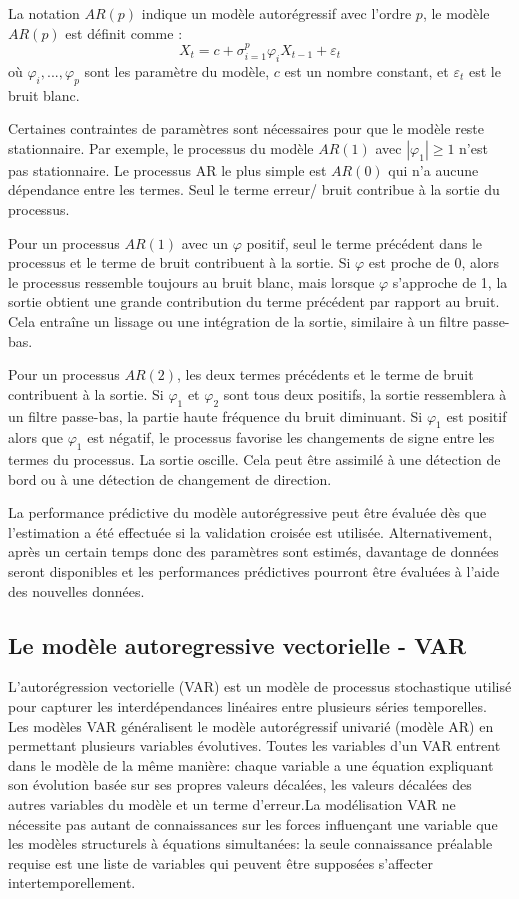 La notation $AR(p)$ indique un modèle autorégressif avec l'ordre $p$, le modèle $AR(p)$ est définit comme : 
$$X_t = c + \sigma_{i = 1}^{p} \varphi_i  X_{t-1} + \varepsilon_t    $$
 où $\varphi_i, ..., \varphi_p$ sont les paramètre du  modèle, $c$ est un nombre constant, et $\varepsilon_t$ est le bruit blanc.
 
 Certaines contraintes de paramètres sont nécessaires pour que le modèle reste stationnaire. Par exemple, le processus du modèle $AR(1)$ avec $ | \varphi_1 | \geq 1 $ n'est pas stationnaire. Le processus AR le plus simple est $AR(0)$ qui n'a aucune dépendance entre les termes. Seul le terme erreur/ bruit contribue à la sortie du processus. 
 
 Pour un processus $AR(1)$ avec un $\varphi$ positif, seul le terme précédent dans le processus et le terme de bruit contribuent à la sortie. Si $\varphi$ est proche de 0, alors le processus ressemble toujours au bruit blanc, mais lorsque $\varphi$  s'approche de 1, la sortie obtient une grande contribution du terme précédent par rapport au bruit. Cela entraîne un lissage ou une intégration de la sortie, similaire à un filtre passe-bas. 
 
Pour un processus $AR(2)$, les deux termes précédents et le terme de bruit contribuent à la sortie. Si $\varphi_1$  et $\varphi_2$  sont tous deux positifs, la sortie ressemblera à un filtre passe-bas, la partie haute fréquence du bruit diminuant. Si $\varphi_1$ est positif alors que $\varphi_1$  est négatif, le processus favorise les changements de signe entre les termes du processus. La sortie oscille. Cela peut être assimilé à une détection de bord ou à une détection de changement de direction.

La performance prédictive du modèle autorégressive peut être évaluée dès que l’estimation a été effectuée si la validation croisée est utilisée. Alternativement, après un certain temps donc des paramètres sont estimés, davantage de données seront disponibles et les performances prédictives pourront être évaluées à l'aide des nouvelles données.
 
\subsection{Le modèle autoregressive vectorielle - VAR}
L’autorégression vectorielle (VAR) est un modèle de processus stochastique utilisé pour capturer les interdépendances linéaires entre plusieurs séries temporelles. Les modèles VAR généralisent le modèle autorégressif univarié (modèle AR) en permettant plusieurs variables évolutives. Toutes les variables d'un VAR entrent dans le modèle de la même manière: chaque variable a une équation expliquant son évolution basée sur ses propres valeurs décalées, les valeurs décalées des autres variables du modèle et un terme d'erreur.La modélisation VAR ne nécessite pas autant de connaissances sur les forces influençant une variable que les modèles structurels à équations simultanées: la seule connaissance préalable requise est une liste de variables qui peuvent être supposées s’affecter intertemporellement. 

